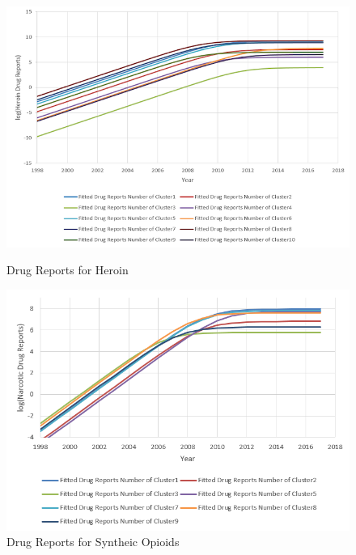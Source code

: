 \documentclass[11pt]{article}
\begin{document}
\begin{figure}[H]
	\centering %
	\begin{minipage}[b]{0.45\textwidth} %
	\centering %
	\includegraphics[scale=0.5]{./figures/3.png} %
	\caption{Drug Reports for Heroin}
	\label{Fig.1}
	\end{minipage}
	\begin{minipage}[b]{0.45\textwidth} %
	\centering %
	\includegraphics[scale=0.5]{./figures/4.png}%
	\caption{Drug Reports for Syntheic Opioids}
	\label{Fig.2}
	\end{minipage}
\end{figure}
\end{document}
